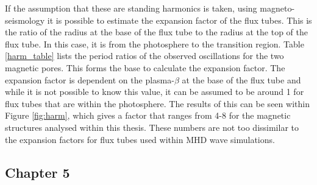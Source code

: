     If the assumption that these are standing harmonics is taken, using magneto-seismology it is possible to estimate the expansion factor of the flux tubes.
    This is the ratio of the radius at the base of the flux tube to the radius at the top of the flux tube.
    In this case, it is from the photosphere to the transition region.
    Table \ref{harm_table} lists the period ratios of the observed oscillations for the two magnetic pores.
    This forms the base to calculate the expansion factor.
    The expansion factor is dependent on the plasma-$\beta$ at the base of the flux tube and while it is not possible to know this value, it can be assumed to be around 1 for flux tubes that are within the photosphere.
    The results of this can be seen within Figure \ref{fig:harm}, which gives a factor that ranges from 4-8 for the magnetic structures analysed within this thesis.
    These numbers are not too dissimilar to the expansion factors for flux tubes used within MHD wave simulations.

	\subsection{Chapter 5}
    
